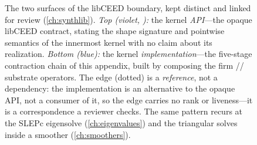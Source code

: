 \begin{figure}[t]
\centering
{}
\caption[The kernel API and the kernel implementation]{The two surfaces of the
libCEED boundary, kept distinct and linked for review (\cref{ch:synthlib}).
\emph{Top (violet, ):} the kernel \emph{API}---the opaque libCEED
contract, stating the shape signature and pointwise semantics of the innermost
kernel with no claim about its realization. \emph{Bottom (blue):} the kernel
\emph{implementation}---the five-stage contraction chain of this appendix, built by
composing the firm \code{[(E,L)]}/\code{[(E,P,C)]}/\code{[(E,P,G)]} substrate
operators. The  edge (dotted) is a \emph{reference}, not a
dependency: the implementation is an alternative to the opaque API, not a consumer
of it, so the edge carries no rank or liveness---it is a correspondence a reviewer
checks. The same  pattern recurs at the SLEPc eigensolve
(\cref{ch:eigenvalues}) and the triangular solves inside a smoother
(\cref{ch:smoothers}).}
\label{fig:appk-extern}
\end{figure}


